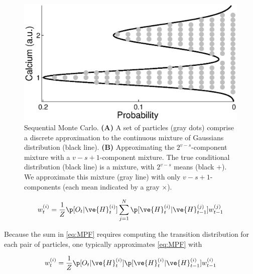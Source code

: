 \begin{figure}
\centering
\includegraphics[width=1.0\linewidth]{PFapprox}
\caption[SMC]{Sequential Monte Carlo.  \textbf{(A)} A set of particles (gray dots) comprise a discrete approximation to the continuous mixture of Gaussians distribution (black line). \textbf{(B)} Approximating the $2^{v-s}$-component mixture with a $v-s+1$-component mixture.  The true conditional distribution (black line) is a mixture, with $2^{v-s}$ means (black $+$).  We approximate this mixture (gray line) with only $v-s+1$-components (each mean indicated by a gray $\times$).}
\label{fig:pf}
\end{figure}


\begin{align}\label{eq:MPF}
w_t^{(i)} = \frac{1}{Z} \p[O_t | \ve{H}_t^{(i)}] %
\sum_{j=1}^N \p[\ve{H}_t^{(i)} | \ve{H}_{t-1}^{(j)}] w_{t-1}^{(j)}
\end{align} %

Because the sum in \eqref{eq:MPF} requires computing the transition distribution for each pair of particles, one typically approximates \eqref{eq:MPF} with

\begin{align}\label{eq:SIS0}
w_t^{(i)} = \frac{1}{Z} \p[O_t | \ve{H}_t^{(i)}] %
\p[\ve{H}_t^{(i)} | \ve{H}_{t-1}^{(i)}] w_{t-1}^{(i)}
\end{align}%

